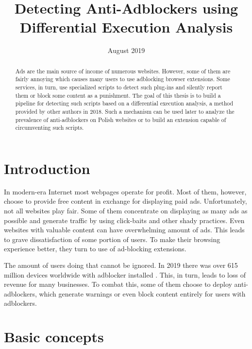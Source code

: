 \documentclass[en]{pracamgr}
\title{Detecting Anti-Adblockers using Differential Execution Analysis}
\date{August 2019}
\begin{document}
\maketitle

\begin{abstract}
Ads are the main source of income of numerous websites. 
However, some of them are fairly annoying which causes many users to use adblocking browser extensions. 
Some services, in turn, use specialized scripts to detect such plug-ins 
and silently report them or block some content as a punishment. 
The goal of this thesis is to build a pipeline for detecting such scripts based on a differential execution analysis, 
a method provided by other authors in 2018. 
Such a mechanism can be used later to analyze the prevalence of anti-adblockers 
on Polish websites or to build an extension capable of circumventing such scripts.

\end{abstract}

\tableofcontents

\chapter*{Introduction}

In modern-era Internet most webpages operate for profit. Most of them, however, choose to provide free content
in exchange for displaying paid ads. Unfortunately, not all websites play fair. Some of them
concentrate on displaying as many ads as possible and generate traffic by using click-baits 
and other shady practices. Even websites with valuable content can have overwhelming amount 
of ads. This leads to grave dissatisfaction of some portion of users. To make their browsing experience better,
they turn to use of ad-blocking extensions.

The amount of users doing that cannot be ignored. In 2019 there was over 615 million devices worldwide
with adblocker installed \cite{internet-facts}. This, in turn, leads to loss of revenue for many businesses.
To combat this, some of them choose to deploy anti-adblockers, which generate warnings 
or even block content entirely for users with adblockers.



\chapter{Basic concepts}
\end{document}
